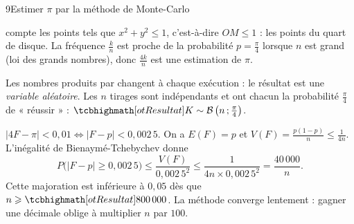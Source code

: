 \begin{corrige}{9}{Estimer $\pi$ par la méthode de Monte-Carlo}
\begin{questions}
  \item {} compte les points tels que $x^{2}+y^{2}\leq1$, c'est-à-dire $OM\leq1$ : les points du quart de disque. La fréquence
    $\frac kn$ est proche de la probabilité $p=\frac{\pi}{4}$ lorsque $n$ est grand (loi des grands nombres), donc $\frac{4k}{n}$ est
    une estimation de $\pi$.
  \item Les nombres produits par  changent à chaque exécution : le résultat est une \emph{variable aléatoire}. Les $n$
    tirages sont indépendants et ont chacun la probabilité $\frac{\pi}{4}$ de « réussir » : $\res{K\sim\mathcal{B}\left(n\pv\tfrac{\pi}{4}\right)}$.
  \item $|4F-\pi|<0{,}01\iff|F-p|<0{,}002\,5$. On a $E(F)=p$ et $V(F)=\frac{p(1-p)}{n}\leq\frac1{4n}$. L'inégalité de
    Bienaymé-Tchebychev donne
    \[P\big(|F-p|\geq0{,}002\,5\big)\leq\frac{V(F)}{0{,}002\,5^{2}}\leq\frac{1}{4n\times0{,}002\,5^{2}}=\frac{40\,000}{n}.\]
    Cette majoration est inférieure à $0{,}05$ dès que $n\geq\res{800\,000}$. La méthode converge lentement : gagner une décimale
    oblige à multiplier $n$ par $100$.
\end{questions}
\end{corrige}

